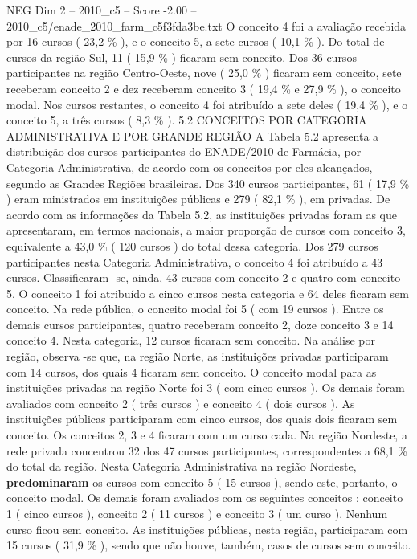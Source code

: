 \begin{textsample}{NEG Dim 2 – 2010\_c5 – Score -2.00 – 2010\_c5/enade\_2010\_farm\_c5f3fda3be.txt}
O conceito 4 foi a avaliação recebida por 16 cursos ( 23,2 \% ), e o conceito 5, a sete cursos ( 10,1 \% ).
Do total de cursos da região Sul, 11 ( 15,9 \% ) ficaram sem conceito.
Dos 36 cursos participantes na região Centro-Oeste, nove ( 25,0 \% ) ficaram sem conceito, sete receberam conceito 2 e dez receberam conceito 3 ( 19,4 \% e 27,9 \% ), o conceito modal.
Nos cursos restantes, o conceito 4 foi atribuído a sete deles ( 19,4 \% ), e o conceito 5, a três cursos ( 8,3 \% ). 5.2 CONCEITOS POR CATEGORIA ADMINISTRATIVA E POR GRANDE REGIÃO A Tabela 5.2 apresenta a distribuição dos cursos participantes do ENADE/2010 de Farmácia, por Categoria Administrativa, de acordo com os conceitos por eles alcançados, segundo as Grandes Regiões brasileiras.
Dos 340 cursos participantes, 61 ( 17,9 \% ) eram ministrados em instituições públicas e 279 ( 82,1 \% ), em privadas.
De acordo com as informações da Tabela 5.2, as instituições privadas foram as que apresentaram, em termos nacionais, a maior proporção de cursos com conceito 3, equivalente a 43,0 \% ( 120 cursos ) do total dessa categoria.
Dos 279 cursos participantes nesta Categoria Administrativa, o conceito 4 foi atribuído a 43 cursos.
Classificaram -se, ainda, 43 cursos com conceito 2 e quatro com conceito 5.
O conceito 1 foi atribuído a cinco cursos nesta categoria e 64 deles ficaram sem conceito.
Na rede pública, o conceito modal foi 5 ( com 19 cursos ).
Entre os demais cursos participantes, quatro receberam conceito 2, doze conceito 3 e 14 conceito 4.
Nesta categoria, 12 cursos ficaram sem conceito.
Na análise por região, observa -se que, na região Norte, as instituições privadas participaram com 14 cursos, dos quais 4 ficaram sem conceito.
O conceito modal para as instituições privadas na região Norte foi 3 ( com cinco cursos ).
Os demais foram avaliados com conceito 2 ( três cursos ) e conceito 4 ( dois cursos ).
As instituições públicas participaram com cinco cursos, dos quais dois ficaram sem conceito.
Os conceitos 2, 3 e 4 ficaram com um curso cada.
Na região Nordeste, a rede privada concentrou 32 dos 47 cursos participantes, correspondentes a 68,1 \% do total da região.
Nesta Categoria Administrativa na região Nordeste, \textbf{predominaram} os cursos com conceito 5 ( 15 cursos ), sendo este, portanto, o conceito modal.
Os demais foram avaliados com os seguintes conceitos : conceito 1 ( cinco cursos ), conceito 2 ( 11 cursos ) e conceito 3 ( um curso ).
Nenhum curso ficou sem conceito.
As instituições públicas, nesta região, participaram com 15 cursos ( 31,9 \% ), sendo que não houve, também, casos de cursos sem conceito.

\end{textsample}
